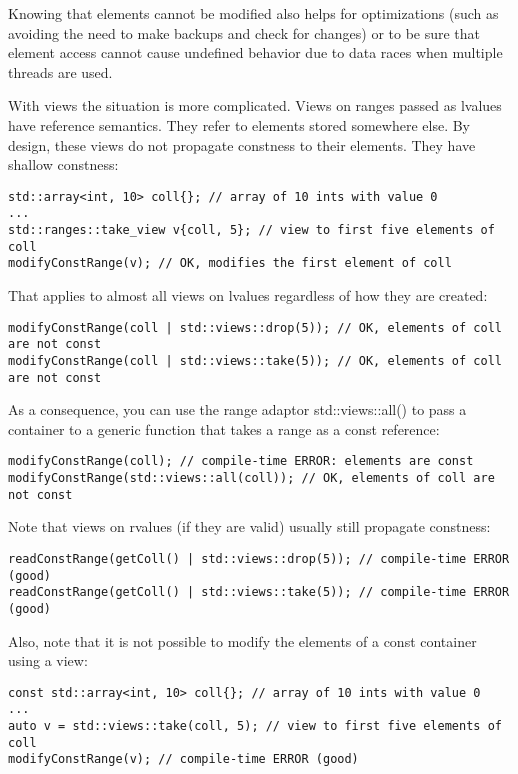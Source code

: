 Knowing that elements cannot be modified also helps for optimizations (such as avoiding the need to make backups and check for changes) or to be sure that element access cannot cause undefined behavior due to data races when multiple threads are used.

With views the situation is more complicated. Views on ranges passed as lvalues have reference semantics. They refer to elements stored somewhere else. By design, these views do not propagate constness to their elements. They have shallow constness:

\begin{lstlisting}[style=styleCXX]
std::array<int, 10> coll{}; // array of 10 ints with value 0
...
std::ranges::take_view v{coll, 5}; // view to first five elements of coll
modifyConstRange(v); // OK, modifies the first element of coll
\end{lstlisting}

That applies to almost all views on lvalues regardless of how they are created:

\begin{lstlisting}[style=styleCXX]
modifyConstRange(coll | std::views::drop(5)); // OK, elements of coll are not const
modifyConstRange(coll | std::views::take(5)); // OK, elements of coll are not const
\end{lstlisting}

As a consequence, you can use the range adaptor std::views::all() to pass a container to a generic function that takes a range as a const reference:

\begin{lstlisting}[style=styleCXX]
modifyConstRange(coll); // compile-time ERROR: elements are const
modifyConstRange(std::views::all(coll)); // OK, elements of coll are not const
\end{lstlisting}

Note that views on rvalues (if they are valid) usually still propagate constness:

\begin{lstlisting}[style=styleCXX]
readConstRange(getColl() | std::views::drop(5)); // compile-time ERROR (good)
readConstRange(getColl() | std::views::take(5)); // compile-time ERROR (good)
\end{lstlisting}

Also, note that it is not possible to modify the elements of a const container using a view:

\begin{lstlisting}[style=styleCXX]
const std::array<int, 10> coll{}; // array of 10 ints with value 0
...
auto v = std::views::take(coll, 5); // view to first five elements of coll
modifyConstRange(v); // compile-time ERROR (good)
\end{lstlisting}

